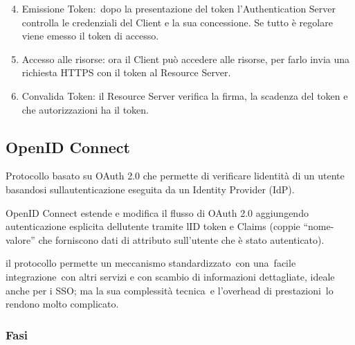 \documentclass[
]{article}
\providecommand{\tightlist}{%
  \setlength{\itemsep}{0pt}\setlength{\parskip}{0pt}}
\begin{document}
{}

\begin{enumerate}
\setcounter{enumi}{3}
\tightlist
\item
  {Emissione Token:}{~dopo la presentazione del token l'Authentication
  Server controlla le credenziali del Client e la sua concessione. Se
  tutto è regolare viene emesso il token di accesso.}
\end{enumerate}

{}

\begin{enumerate}
\setcounter{enumi}{4}
\tightlist
\item
  {Accesso alle risorse}{: ora il Client può accedere alle risorse, per
  farlo invia una richiesta HTTPS con il token al Resource Server.}
\end{enumerate}

{}

\begin{enumerate}
\setcounter{enumi}{5}
\tightlist
\item
  {Convalida Token}{: il Resource Server verifica la firma, la scadenza
  del token e che autorizzazioni ha il token.}
\end{enumerate}

\subsection{\texorpdfstring{{OpenID
Connect}}{OpenID Connect}}\label{h.csblvxo7houx}

{Protocollo basato su OAuth 2.0 che permette di verificare
l\textquotesingle identità di un utente basandosi
sull\textquotesingle autenticazione eseguita da un Identity Provider
(IdP).}

{}

{OpenID Connect estende e modifica il flusso di OAuth 2.0 aggiungendo
autenticazione esplicita dell\textquotesingle utente tramite
l\textquotesingle ID token e Claims (coppie ``nome-valore'' che
forniscono dati di attributo sull'utente che è stato autenticato).}

{}

{il protocollo permette un }{meccanismo standardizzato}{~con
una}{~facile integrazione}{~con altri servizi e con scambio di
}{informazioni dettagliat}{e, }{ideale }{anche }{per }{i }{SSO}{; }{ma
}{la sua }{complessità tecnica}{~e l'}{overhead di prestazioni}{~lo
rendono molto complicato.}

\subsubsection{\texorpdfstring{{Fasi}}{Fasi}}\label{h.kargw66fsm2r}
\end{document}
